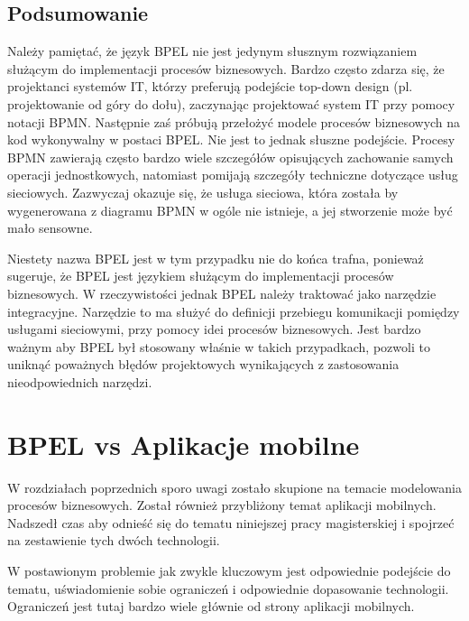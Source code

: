 \subsection{Podsumowanie}
\label{sec:bpelSummary}

Należy pamiętać, że język BPEL nie jest jedynym słusznym rozwiązaniem służącym do implementacji procesów biznesowych. Bardzo często  zdarza się, że projektanci systemów IT, którzy preferują podejście top-down design (pl. projektowanie od góry do dołu), zaczynając projektować system IT przy pomocy notacji BPMN. Następnie zaś próbują przełożyć modele procesów biznesowych na kod wykonywalny w postaci BPEL. Nie jest to jednak słuszne podejście. Procesy BPMN zawierają często bardzo wiele szczegółów opisujących zachowanie samych operacji jednostkowych, natomiast pomijają szczegóły techniczne dotyczące usług sieciowych.  Zazwyczaj okazuje się, że usługa sieciowa, która została by wygenerowana z diagramu BPMN w ogóle nie istnieje, a jej stworzenie może być mało sensowne.

Niestety nazwa BPEL jest w tym przypadku nie do końca trafna, ponieważ sugeruje, że BPEL jest językiem służącym do implementacji procesów biznesowych. W rzeczywistości jednak BPEL należy traktować jako narzędzie integracyjne. Narzędzie to ma służyć do definicji przebiegu komunikacji pomiędzy usługami sieciowymi, przy pomocy idei procesów biznesowych. Jest bardzo ważnym aby BPEL był stosowany właśnie w takich przypadkach, pozwoli to uniknąć poważnych błędów projektowych wynikających z zastosowania nieodpowiednich narzędzi.  



\section{BPEL vs Aplikacje mobilne}
\label{sec:bpelVSmobileApp}

W rozdziałach poprzednich sporo uwagi zostało skupione na temacie modelowania procesów biznesowych. Został również przybliżony temat aplikacji mobilnych. Nadszedł czas aby odnieść się do tematu niniejszej pracy magisterskiej i spojrzeć na zestawienie tych dwóch technologii. 

W postawionym problemie jak zwykle kluczowym jest odpowiednie podejście do tematu, uświadomienie sobie ograniczeń i odpowiednie dopasowanie technologii. Ograniczeń jest tutaj bardzo wiele głównie od strony aplikacji mobilnych.

